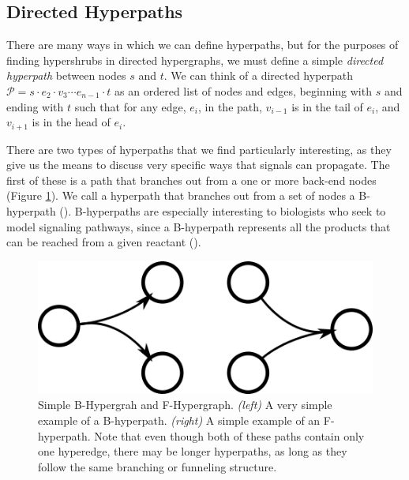 \documentclass[12pt,twoside]{reedthesis}
\theoremstyle{definition}
\begin{document}
\subsection{Directed Hyperpaths}

There are many ways in which we can define hyperpaths, but for the purposes of finding hypershrubs in directed hypergraphs, we must define a simple \textit{directed hyperpath} between nodes $s$ and $t$. We can think of a directed hyperpath $\mathcal{P}=s \cdot e_2 \cdot v_3 \cdots e_{n-1} \cdot t$ as an ordered list of nodes and edges, beginning with $s$ and ending with $t$ such that for any edge, $e_i$, in the path, $v_{i-1}$ is in the tail of $e_i$, and $v_{i+1}$ is in the head of $e_i$.\par

There are two types of hyperpaths that we find particularly interesting, as they give us the means to discuss very specific ways that signals can propagate. The first of these is a path that branches out from a one or more back-end nodes (Figure \ref{fig:BF-hyperpaths}). We call a hyperpath that branches out from a set of nodes a B-hyperpath (\cite{Gallo1993}). B-hyperpaths are especially interesting to biologists who seek to model signaling pathways, since a B-hyperpath represents all the products that can be reached from a given reactant (\cite{Ritz2014}).

\begin{figure}[!h]
  \begin{center}
    \includegraphics[width=\textwidth/2]{BF-hyperpaths}
  \caption[Simple B-Hypergrah and F-Hypergraph.]{Simple B-Hypergrah and F-Hypergraph. \textit{(left) }A very simple example of a B-hyperpath. \textit{(right) }A simple example of an F-hyperpath. Note that even though both of these paths contain only one hyperedge, there may be longer hyperpaths, as long as they follow the same branching or funneling structure.}
  \label{fig:BF-hyperpaths}
  \end{center}
\end{figure}
\end{document}
